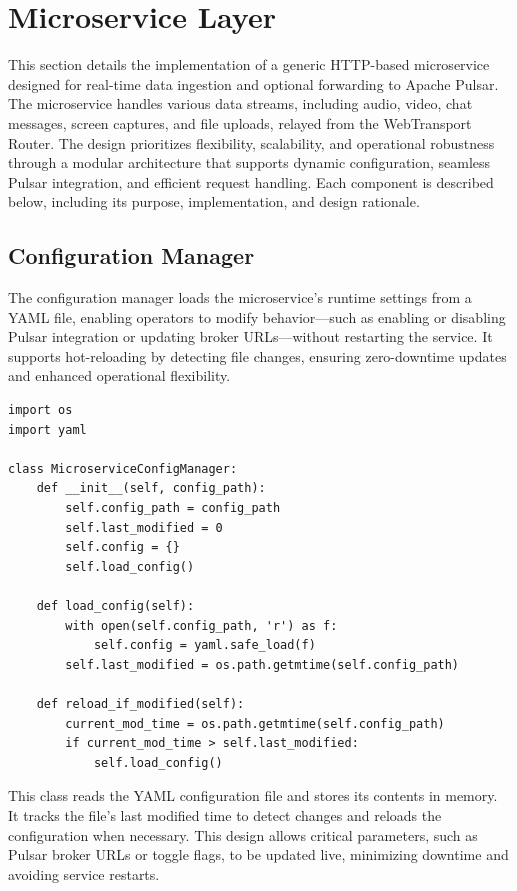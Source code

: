 \section{Microservice Layer}
This section details the implementation of a generic HTTP-based microservice designed for real-time data ingestion and optional forwarding to Apache Pulsar. The microservice handles various data streams, including audio, video, chat messages, screen captures, and file uploads, relayed from the WebTransport Router. The design prioritizes flexibility, scalability, and operational robustness through a modular architecture that supports dynamic configuration, seamless Pulsar integration, and efficient request handling. Each component is described below, including its purpose, implementation, and design rationale.

\subsection{Configuration Manager}
The configuration manager loads the microservice’s runtime settings from a YAML file, enabling operators to modify behavior—such as enabling or disabling Pulsar integration or updating broker URLs—without restarting the service. It supports hot-reloading by detecting file changes, ensuring zero-downtime updates and enhanced operational flexibility.

\begin{lstlisting}
import os
import yaml

class MicroserviceConfigManager:
    def __init__(self, config_path):
        self.config_path = config_path
        self.last_modified = 0
        self.config = {}
        self.load_config()

    def load_config(self):
        with open(self.config_path, 'r') as f:
            self.config = yaml.safe_load(f)
        self.last_modified = os.path.getmtime(self.config_path)

    def reload_if_modified(self):
        current_mod_time = os.path.getmtime(self.config_path)
        if current_mod_time > self.last_modified:
            self.load_config()
\end{lstlisting}

This class reads the YAML configuration file and stores its contents in memory. It tracks the file’s last modified time to detect changes and reloads the configuration when necessary. This design allows critical parameters, such as Pulsar broker URLs or toggle flags, to be updated live, minimizing downtime and avoiding service restarts.

